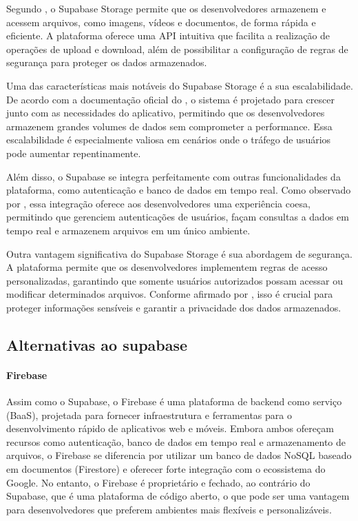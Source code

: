 Segundo \cite{Gregoire2021}, o Supabase Storage permite que os desenvolvedores armazenem
e acessem arquivos, como imagens, vídeos e documentos, de forma rápida e eficiente. A
plataforma oferece uma API intuitiva que facilita a realização de operações de upload e download,
além de possibilitar a configuração de regras de segurança para proteger os dados armazenados.

Uma das características mais notáveis do Supabase Storage é a sua escalabilidade. De
acordo com a documentação oficial do \cite{supabase2023documentation}, o sistema é projetado para crescer
junto com as necessidades do aplicativo, permitindo que os desenvolvedores armazenem grandes
volumes de dados sem comprometer a performance. Essa escalabilidade é especialmente valiosa
em cenários onde o tráfego de usuários pode aumentar repentinamente.

Além disso, o Supabase se integra perfeitamente com outras funcionalidades da plataforma, como autenticação e banco de dados em tempo real. Como observado por \cite{Miller2022}, essa integração oferece aos desenvolvedores uma experiência coesa, permitindo que gerenciem autenticações de usuários, façam consultas a dados em tempo real e armazenem arquivos em um único ambiente.

Outra vantagem significativa do Supabase Storage é sua abordagem de segurança. A
plataforma permite que os desenvolvedores implementem regras de acesso personalizadas,
garantindo que somente usuários autorizados possam acessar ou modificar determinados arquivos.
Conforme afirmado por \cite{ONeill2022}, isso é crucial para proteger informações sensíveis e
garantir a privacidade dos dados armazenados.

\subsection{Alternativas ao supabase}

\paragraph{Firebase} Assim como o Supabase, o Firebase é uma plataforma de backend como serviço (BaaS), projetada para fornecer infraestrutura e ferramentas para o desenvolvimento rápido de aplicativos web e móveis. Embora ambos ofereçam recursos como autenticação, banco de dados em tempo real e armazenamento de arquivos, o Firebase se diferencia por utilizar um banco de dados NoSQL baseado em documentos (Firestore) e oferecer forte integração com o ecossistema do Google. No entanto, o Firebase é proprietário e fechado, ao contrário do Supabase, que é uma plataforma de código aberto, o que pode ser uma vantagem para desenvolvedores que preferem ambientes mais flexíveis e personalizáveis.

